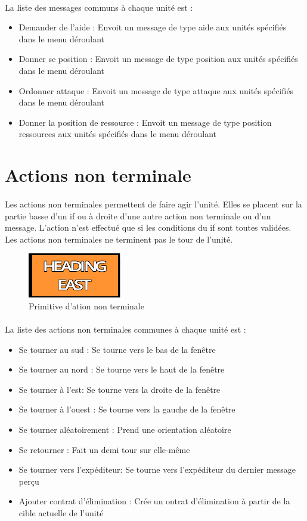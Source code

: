 \documentclass{report}
\begin{document}
\paragraph{}
La liste des messages communs à chaque unité est :
\begin{itemize}
\item Demander de l'aide : Envoit un message de type aide aux unités spécifiés dans le menu déroulant
\item Donner se position : Envoit un message de type position aux unités spécifiés dans le menu déroulant
\item Ordonner attaque : Envoit un message de type attaque aux unités spécifiés dans le menu déroulant
\item Donner la position de ressource : Envoit un message de type position ressources aux unités spécifiés dans le menu déroulant
\end{itemize}
\newpage
\section{Actions non terminale}
\paragraph{}
Les actions non terminales permettent de faire agir l'unité. Elles se placent sur la partie basse d'un if ou à droite d'une autre action non terminale ou d'un message. L'action n'est effectué que si les conditions du if sont toutes validées. Les actions non terminales ne terminent pas le tour de l'unité.
\begin{figure}[!h]
	\centering
		\includegraphics[scale=1]{action2.png}
	\caption{Primitive d'ation non terminale}
\end{figure}
\paragraph{}
La liste des actions non terminales communes à chaque unité est :
\begin{itemize}
\item Se tourner au sud : Se tourne vers le bas de la fenêtre
\item Se tourner au nord : Se tourne vers le haut de la fenêtre
\item Se tourner à l'est: Se tourne vers la droite de la fenêtre
\item Se tourner à l'ouest : Se tourne vers la gauche de la fenêtre
\item Se tourner aléatoirement : Prend une orientation aléatoire
\item Se retourner : Fait un demi tour sur elle-même
\item Se tourner vers l'expéditeur: Se tourne vers l'expéditeur du dernier message perçu
\item Ajouter contrat d'élimination : Crée un ontrat d'élimination à partir de la cible actuelle de l'unité
\end{itemize}
\end{document}
